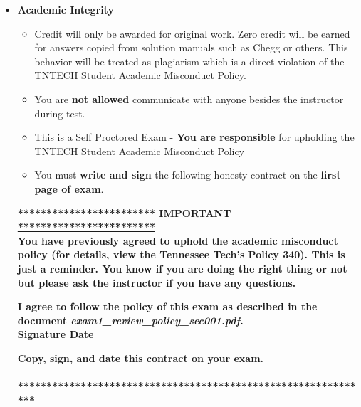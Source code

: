 \documentclass[11pt]{article}
\begin{document}
\begin{itemize}
\begin{itemize}
		\item  Personal computer and a writing device of your choice, pencil or tablet, etc.
			
	\end{itemize}

\newpage
		\item  \textbf{ \Large Academic Integrity}
\begin{itemize}

		\item {\B Credit will only be awarded for original work. Zero credit will be earned for answers copied from solution manuals such as Chegg or others. This behavior will be treated as plagiarism which is a direct violation of the TNTECH Student Academic Misconduct Policy.}

		\item  You are {\bf not allowed} communicate with anyone besides the instructor during test. 
		\item This is a Self Proctored Exam - {\bf You are responsible} for upholding the TNTECH Student Academic Misconduct Policy
		\item  You must {\bf write and sign} the following honesty contract on the {\bf first page of exam}. 
		
		

\end{itemize}


 {\R  \bf \underline{************************ IMPORTANT ************************}} \vspace{3mm}\\
			  {\R \bf You have previously agreed to uphold the academic misconduct policy (for details, view the
Tennessee Tech's Policy 340). This is just a reminder. You know if you are doing the right thing or not but please ask the instructor if you have any questions. }
\begin{framed}
	
	\vspace{3mm}	 \textbf{ I \underline{\hspace{50mm}} agree to follow the policy of this exam \vspc as described in the document {\it exam1\_review\_policy\_sec001.pdf}.  }\vspace{3mm}\\
		 \textbf{\Large Signature \underline{\hspace{80mm}} Date\underline{\hspace{20mm} }}\\

\end{framed}
			{\R  \bf Copy, sign, and date this contract on your exam. }   \vspace{1mm}\\
			{\R  \bf \underline{\hspace{140mm}}} \\
			{\R  \bf ***************************************************************} 


\end{itemize}
\end{document}

